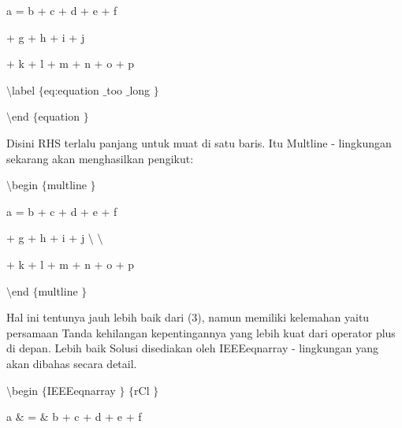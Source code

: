 \vspace{12pt}
\noindent 
a = b + c + d + e + f \par
\vspace{12pt}
\noindent 
+ g + h + i + j \par
\vspace{12pt}
\noindent 
+ k + l + m + n + o + p \par
\vspace{12pt}
\noindent 
 $  \setminus  $label $  \{  $eq:equation $  \_  $too $  \_  $long $  \}  $ \par
\vspace{12pt}
\noindent 
 $  \setminus  $end $  \{  $equation $  \}  $ \par
\vspace{12pt}
\vspace{16pt}
\noindent 
Disini RHS terlalu panjang untuk muat di satu baris. Itu Multline - lingkungan sekarang akan menghasilkan pengikut: \par
\vspace{12pt}
\noindent 
 $  \setminus  $begin $  \{  $multline $  \}  $ \par
\vspace{12pt}
\noindent 
a = b + c + d + e + f \par
\vspace{12pt}
\noindent 
+ g + h + i + j  $  \setminus  $ $  \setminus  $ \par
\vspace{12pt}
\noindent 
+ k + l + m + n + o + p \par
\vspace{12pt}
\noindent 
 $  \setminus  $end $  \{  $multline $  \}  $ \par
\vspace{12pt}
\vspace{16pt}
\noindent 
 \hspace*{0.5in} Hal ini tentunya jauh lebih baik dari (3), namun memiliki kelemahan yaitu persamaan Tanda kehilangan kepentingannya yang lebih kuat dari operator plus di depan. Lebih baik Solusi disediakan oleh IEEEeqnarray - lingkungan yang akan dibahas secara detail. \par
\vspace{12pt}
\noindent 
 $  \setminus  $begin $  \{  $IEEEeqnarray $  \}  $ $  \{  $rCl $  \}  $ \par
\vspace{12pt}
\noindent 
a  $  \&  $ =  $  \&  $ b + c + d + e + f \par
\vspace{12pt}
